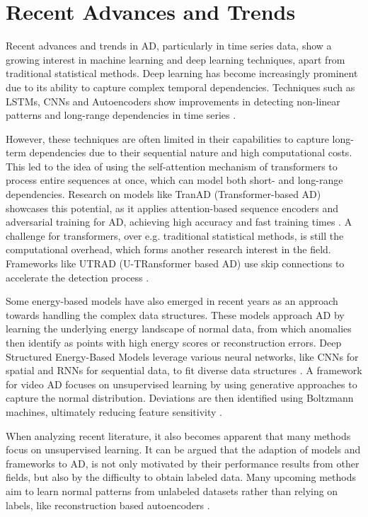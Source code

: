 \section{Recent Advances and Trends}
Recent advances and trends in AD, particularly in time series data, show a growing interest in machine learning and deep learning techniques, apart from traditional statistical methods. Deep learning has become increasingly prominent due to its ability to capture complex temporal dependencies. Techniques such as LSTMs, CNNs \cite{SR-CNN} and Autoencoders \cite{IE-CAE} show improvements in detecting non-linear patterns and long-range dependencies in time series \cite{Braei2020, Schmidl2022}.

However, these techniques are often limited in their capabilities to capture long-term dependencies due to their sequential nature and high computational costs. This led to the idea of using the self-attention mechanism of transformers to process entire sequences at once, which can model both short- and long-range dependencies. Research on models like TranAD (Transformer-based AD) showcases this potential, as it applies attention-based sequence encoders and adversarial training for AD, achieving high accuracy and fast training times \cite{Tuli2022}. A challenge for transformers, over e.g. traditional statistical methods, is still the computational overhead, which forms another research interest in the field. Frameworks like UTRAD (U-TRansformer based AD) use skip connections to accelerate the detection process \cite{Chen2022}.

Some energy-based models have also emerged in recent years as an approach towards handling the complex data structures. These models approach AD by learning the underlying energy landscape of normal data, from which anomalies then identify as points with high energy scores or reconstruction errors. Deep Structured Energy-Based Models leverage various neural networks, like CNNs for spatial and RNNs for sequential data, to fit diverse data structures \cite{Zhai2016}. 
A framework for video AD focuses on unsupervised learning by using generative approaches to capture the normal distribution. Deviations are then identified using Boltzmann machines, ultimately reducing feature sensitivity \cite{Vu2017}.

When analyzing recent literature, it also becomes apparent that many methods focus on unsupervised learning. It can be argued that the adaption of models and frameworks to AD, is not only motivated by their performance results from other fields, but also by the difficulty to obtain labeled data. Many upcoming methods aim to learn normal patterns from unlabeled datasets rather than relying on labels, like reconstruction based autoencoders \cite{IE-CAE, Cao2023}.

